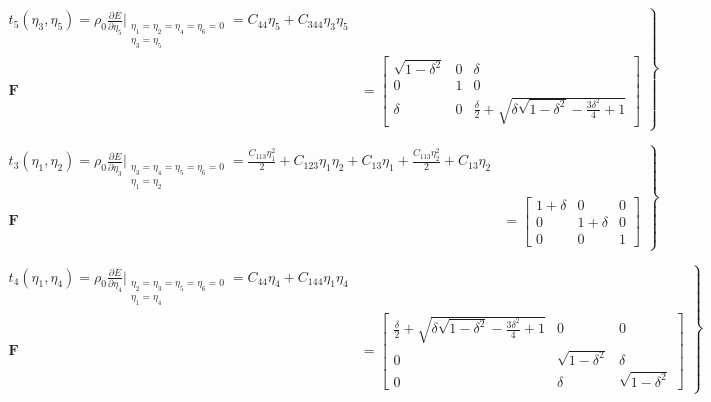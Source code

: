 \documentclass[showpacs,aps,floatfix,prb,reprint,superscriptaddress,onecolumn]{revtex4-1}
\begin{document}
\begin{enumerate}


\begin{equation}
\label{eqn:SM-s9}
  \left.\begin{aligned}
        t_{5} \left(\eta_{3}, \eta_{5}\right) = \rho_{0} \frac{\partial E}{\partial \eta_{5}}\Bigr|_{\substack{\eta_1=\eta_2=\eta_4=\eta_6=0 \\ \eta_3=\eta_5}} = C_{44}\eta_{5} + C_{344}\eta_{3}\eta_{5}\\
        \bm{F}&=\begin{bmatrix} \sqrt{1-\delta^2} & 0 & \delta \\ 0 & 1 & 0 \\ \delta & 0 & \frac{\delta}{2} + \sqrt{\delta \sqrt{1-\delta^2}- \frac{3 \delta^{2}}{4} + 1} \end{bmatrix}
       \end{aligned}
			\right\}
\end{equation}


\begin{equation}
\label{eqn:SM-s10}
  \left.\begin{aligned}
        t_{3} \left(\eta_{1}, \eta_{2}\right) = \rho_{0} \frac{\partial E}{\partial \eta_{3}}\Bigr|_{\substack{\eta_3=\eta_4=\eta_5=\eta_6=0 \\ \eta_1 = \eta_2}} = \frac{C_{113}\eta_{1}^2}{2} + C_{123}\eta_{1}\eta_{2} + C_{13}\eta_{1} +  \frac{C_{113}\eta_{2}^2}{2} + C_{13}\eta_{2}\\
        \bm{F}&=\begin{bmatrix} 1+\delta & 0 & 0 \\ 0 & 1+\delta & 0 \\ 0 & 0 & 1 \end{bmatrix}
       \end{aligned}
			\right\}
\end{equation}


\begin{equation}
\label{eqn:SM-s11}
  \left.\begin{aligned}
        t_{4} \left(\eta_{1}, \eta_{4}\right) = \rho_{0} \frac{\partial E}{\partial \eta_{4}}\Bigr|_{\substack{\eta_2=\eta_3=\eta_5=\eta_6=0 \\ \eta_{1}=\eta_{4}}} = C_{44}\eta_{4} + C_{144}\eta_{1}\eta_{4}\\
        \bm{F}&=\begin{bmatrix} \frac{\delta}{2}+\sqrt{\delta \sqrt{1-\delta^2}-\frac{3 \delta^2}{4}+1} & 0 & 0 \\ 0 & \sqrt{1-\delta^2} & \delta \\ 0 & \delta & \sqrt{1-\delta^2} \end{bmatrix}
       \end{aligned}
			\right\}
\end{equation}


\end{enumerate}
\end{document}
